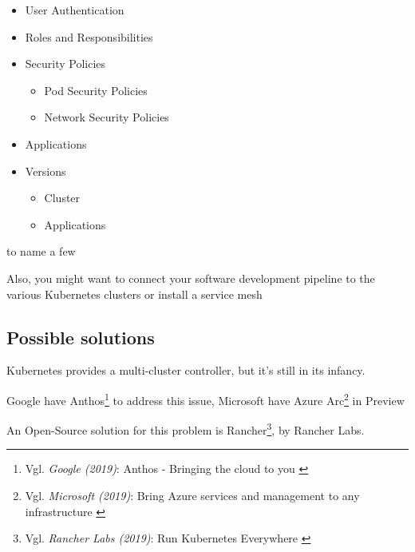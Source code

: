 \begin{itemize}
\item User Authentication
\item Roles and Responsibilities
\item Security Policies
    \begin{itemize}
    \item Pod Security Policies
    \item Network Security Policies
    \end{itemize}
\item Applications
\item Versions
    \begin{itemize}
    \item Cluster 
    \item Applications
    \end{itemize}
\end{itemize}

to name a few

Also, you might want to connect your software development pipeline to the various Kubernetes clusters or install a service mesh

\subsection{Possible solutions}

Kubernetes provides a multi-cluster controller, but it's still in its infancy.

Google have Anthos\footnote{Vgl. \textit{Google (2019)}: Anthos - Bringing the cloud to you \cite{googleAnthos}} to address this issue, Microsoft have Azure Arc\footnote{Vgl. \textit{Microsoft (2019)}: Bring Azure services and management to any infrastructure \cite{azureArc}} in Preview

An Open-Source solution for this problem is Rancher\footnote{Vgl. \textit{Rancher Labs (2019)}: Run Kubernetes Everywhere \cite{rancher}}, by Rancher Labs.
